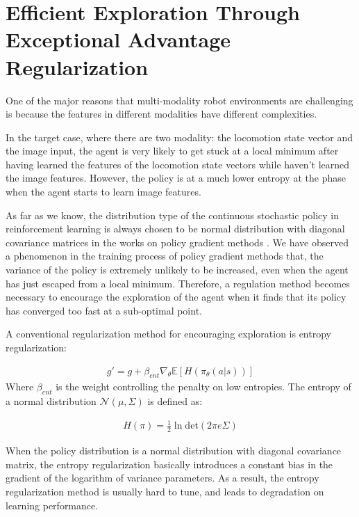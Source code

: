 \section{Efficient Exploration Through Exceptional Advantage Regularization}
One of the major reasons that multi-modality robot environments are challenging is because the features in different modalities have different complexities.

In the target case, where there are two modality: the locomotion state vector and the image input, the agent is very likely to get stuck at a local minimum after having learned the features of the locomotion state vectors while haven't learned the image features. However, the policy is at a much lower entropy at the phase when the agent starts to learn image features.

As far as we know, the distribution type of the continuous stochastic policy in reinforcement learning is always chosen to be normal distribution with diagonal covariance matrices in the works on policy gradient methods . We have observed a phenomenon in the training process of policy gradient methods that, the variance of the policy is extremely unlikely to be increased, even when the agent has just escaped from a local minimum. Therefore, a regulation method becomes necessary to encourage the exploration of the agent when it finds that its policy has converged too fast at a sub-optimal point.

A conventional regularization method for encouraging exploration is entropy regularization:

\begin{align}
g' = g +\beta_{ent}\nabla_\theta \mathbb{E}[ H(\pi_\theta(a|s)) ]
\end{align}
Where $\beta_{ent}$ is the weight controlling the penalty on low entropies.
The entropy of a normal distribution $\mathcal{N}(\mu,\Sigma)$ is defined as:

\begin{align}
	H(\pi) =  \frac{1}{2} \ln \mathrm{det}(2\pi e \Sigma)
\end{align}

When the policy distribution is a normal distribution with diagonal covariance matrix, the entropy regularization basically introduces a constant bias in the gradient of the logarithm of variance parameters. As a result, the entropy regularization method is usually hard to tune, and leads to degradation on learning performance.

